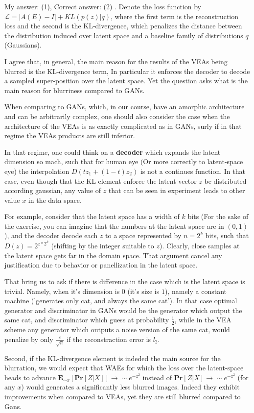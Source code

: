 \documentclass{article}
\newcommand{\inb}[1]{ \color{blue}#1 \color{black} }
\begin{document}
\inb{ My answer: (1), Correct answer: (2)}. 
Denote the loss function by $\mathcal{L} = | A(E) - I | + KL( p(z) | q )$, where the first term is the reconstruction loss and the second is the KL-divergence, which penalizes the distance between the distribution induced over latent space and a baseline family of distributions $q$ (Gaussians).

I agree that, in general, the main reason for the results of the VEAs being blurred is the KL-divergence term, In particular it enforces the decoder to decode a sampled super-position over the latent space. Yet the question asks what is the main reason for blurriness compared to GANs.  

When comparing to GANs, which, in our course, have an amorphic architecture and can be arbitrarily complex, one should also consider the case when the architecture of the VEAs is as exactly complicated as in GANs, surly if in that regime the VEAs products are still inferior. 


In that regime, one could think on a \textbf{decoder} which expands the latent dimension so mach, such that for human eye (Or more correctly to latent-space eye) the interpolation $D(tz_{1} + (1-t)z_{2})$ is not a continues function. In that case, even though that the KL-element enforce the latent vector $z$ be distributed according gaussian, any value of $z$ that can be seen in experiment leads to other value $x$ in the data space.  

For example, consider that the latent space has a width of $k$ bits (For the sake of the exercise, you can imagine that the numbers at the latent space are in $(0,1)$), and the decoder decode each $z$ to a space represented by $n = 2^{k}$ bits, such that $D(z) = 2^{ z * 2^{k} }$ (shifting by the integer suitable to $z$). Clearly, close samples at the latent space gets far in the domain space. That argument cancel any justification due to behavior or panellization in the latent space. 

That bring us to ask if there is difference in the case which is the latent space is trivial. Namely, when it's dimension is $0$ (it's size is $1$), namely a constant machine ('generates only cat, and always the same cat'). In that case optimal generator and discriminator in GANs would be the generator which output the same cat, and discriminator which guess at probability $\frac{1}{2}$, while in the VEA scheme any generator which outputs a noise version of the same cat, would penalize by only $\frac{\varepsilon}{\sqrt{n}}$ if the reconstraction error is $l_2$.      



Second, if the KL-divergence element is indeded the main source for the blurration, we would expect that WAEs for which the loss over the latent-space heads to advance $\mathbf{E}_{\sim x} \left[ \mathbf{Pr} \left[  Z | X \right]    \right] \rightarrow \sim e^{-z^{2}} $ instead of $ \mathbf{Pr} \left[  Z | X \right] \rightarrow \sim e^{-z^{2}} $ (for any $x$) would generates a significantly less blurred images. Indeed they exhibit improvements when compared to VEAs, yet they are still blurred compared to Gans.   
\end{document}
